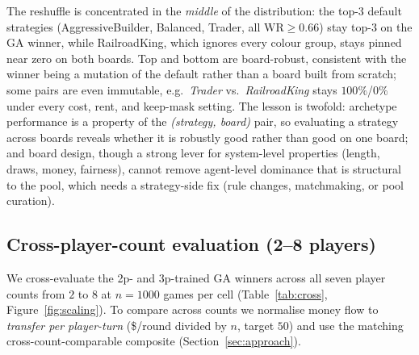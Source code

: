 \documentclass[10pt]{article}
\begin{document}
The reshuffle is concentrated in the \emph{middle} of the
distribution: the top-3 default strategies (AggressiveBuilder,
Balanced, Trader, all $\text{WR}\geq 0.66$) stay top-3 on the GA
winner, while RailroadKing, which ignores every colour group, stays
pinned near zero on both boards. Top and bottom are board-robust,
consistent with the winner being a mutation of the default rather than
a board built from scratch; some pairs are even immutable, e.g.\
\textsl{Trader} vs.\ \textsl{RailroadKing} stays $100\%$/$0\%$ under
every cost, rent, and keep-mask setting. The lesson is twofold:
archetype performance is a property of the \emph{(strategy, board)}
pair, so evaluating a strategy across boards reveals whether it is
robustly good rather than good on one board; and board design, though a
strong lever for system-level properties (length, draws, money,
fairness), cannot remove agent-level dominance that is structural to
the pool, which needs a strategy-side fix (rule changes, matchmaking,
or pool curation).

\subsection{Cross-player-count evaluation (2--8 players)}\label{sec:cross}

We cross-evaluate the 2p- and 3p-trained GA winners across all seven
player counts from $2$ to $8$ at $n{=}1000$ games per cell
(Table~\ref{tab:cross}, Figure~\ref{fig:scaling}). To compare across
counts we normalise money flow to \emph{transfer per player-turn}
(\$/round divided by $n$, target $50$) and use the matching
cross-count-comparable composite (Section~\ref{sec:approach}).
\end{document}
